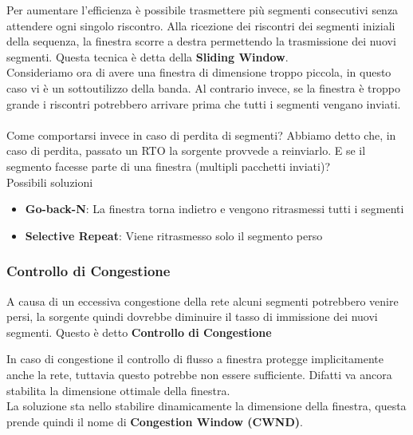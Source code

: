 \documentclass{article}
\newcounter{subsubsubsection}[subsubsection]
\begin{document}
                    Per aumentare l'efficienza è possibile trasmettere più segmenti consecutivi senza attendere ogni singolo riscontro. Alla ricezione dei riscontri dei segmenti iniziali della sequenza, la finestra scorre a destra permettendo la trasmissione dei nuovi segmenti. Questa tecnica è detta della \textbf{Sliding Window}.\\
                    Consideriamo ora di avere una finestra di dimensione troppo piccola, in questo caso vi è un sottoutilizzo della banda. Al contrario invece, se la finestra è troppo grande i riscontri potrebbero arrivare prima che tutti i segmenti vengano inviati.\\     
                    \\
                    Come comportarsi invece in caso di perdita di segmenti? Abbiamo detto che, in caso di perdita, passato un RTO la sorgente provvede a reinviarlo. E se il segmento facesse parte di una finestra (multipli pacchetti inviati)?\\
                    Possibili soluzioni
                    \begin{itemize}
                        \item \textbf{Go-back-N}: La finestra torna indietro e vengono ritrasmessi tutti i segmenti
                        \item \textbf{Selective Repeat}: Viene ritrasmesso solo il segmento perso
                    \end{itemize}

            \subsubsection{Controllo di Congestione}
                A causa di un eccessiva congestione della rete alcuni segmenti potrebbero venire persi, la sorgente quindi dovrebbe diminuire il tasso di immissione dei nuovi segmenti. Questo è detto \textbf{Controllo di Congestione}

                    In caso di congestione il controllo di flusso a finestra protegge implicitamente anche la rete, tuttavia questo potrebbe non essere sufficiente. Difatti va ancora stabilita la dimensione ottimale della finestra.\\
                    La soluzione sta nello stabilire dinamicamente la dimensione della finestra, questa prende quindi il nome di \textbf{Congestion Window (CWND)}.
\end{document}
